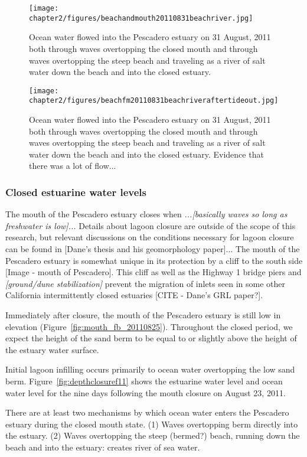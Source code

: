 \begin{figure}
\texttt{[image: chapter2/figures/beachandmouth20110831beachriver.jpg]} \caption{Ocean water flowed into the Pescadero estuary on 31 August, 2011 both through waves overtopping the closed mouth and through waves overtopping the steep beach and traveling as a river of salt water down the beach and into the closed estuary.}
\label{fig:beachriver} \end{figure}

\begin{figure}
\texttt{[image: chapter2/figures/beachfm20110831beachriveraftertideout.jpg]} \caption{Ocean water flowed into the Pescadero estuary on 31 August, 2011 both through waves overtopping the closed mouth and through waves overtopping the steep beach and traveling as a river of salt water down the beach and into the closed estuary. Evidence that there was a lot of flow...}
\label{fig:beachriver_after} \end{figure}

\subsubsection{Closed estuarine water levels} \label{cl_wl}
The mouth of the Pescadero estuary closes when \emph{...[basically waves
so long as freshwater is low]...} Details about lagoon closure are
outside of the scope of this research, but relevant discussions on the
conditions necessary for lagoon closure can be found in [Dane's thesis
and his geomorphology paper]... The mouth of the Pescadero estuary is
somewhat unique in its protection by a cliff to the south side [Image -
mouth of Pescadero]. This cliff as well as the Highway 1 bridge piers
and \emph{[ground/dune stabilization]} prevent the migration of inlets
seen in some other California intermittently closed estuaries [CITE -
Dane's GRL paper?].

Immediately after closure, the mouth of the Pescadero estuary is still
low in elevation (Figure~\ref{fig:mouth_fb_20110825}). Throughout the closed period, we
expect the height of the sand berm to be equal to or slightly above the
height of the estuary water surface.

Initial lagoon infilling occurs primarily to ocean water overtopping the
low sand berm. Figure~\ref{fig:depthclosuref11} shows the estuarine water level and ocean
water level for the nine days following the mouth closure on August 23, 2011. 

There are at least two mechanisms by which ocean water enters the
Pescadero estuary during the closed mouth state. (1) Waves overtopping
berm directly into the estuary. (2) Waves overtopping the steep
(bermed?) beach, running down the beach and into the estuary: creates
river of sea water.

